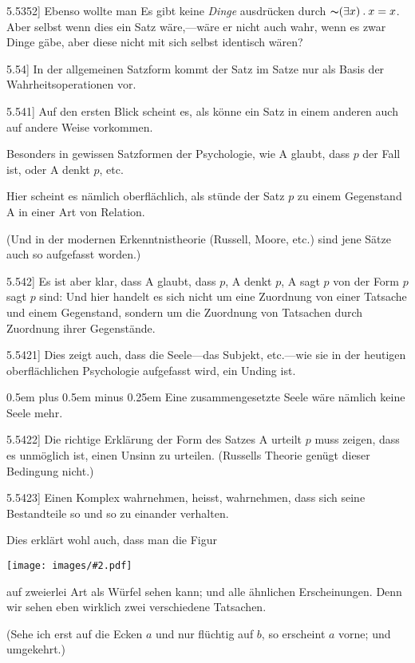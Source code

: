 \documentclass[12pt,oneside]{book}[2007/10/19]
\newcommand{\PropERef}[1]{\hyperref[PropE:#1]{#1}}
\newcommand{\PropositionG}[2]{%
  \item[\phantomsection\label{PropG:#1}\PropERef{#1}] #2%
}
\newcommand{\Illustration}[2][0.3\textwidth]{%
  \begin{center}
  \texttt{[image: images/\#2.pdf]}
  \end{center}
}
\newcommand{\Not}[1]{\mathord{\thicksim} #1}
\newcommand{\DotOp}{\mathbin{.}}
\newcommand{\Emph}[1]{\emph{#1}}%
\newcommand{\verystretchyspace}{\spaceskip0.5em plus 0.5em minus 0.25em}
\begin{document}
\begin{propositions}
\PropositionG{5.5352}
{Ebenso wollte man \glqq{}Es gibt keine \Emph{Dinge}\grqq{} ausdrücken
durch \glqq{}$\Not{(\exists x) \DotOp x = x}$\grqq{}. Aber selbst wenn
dies ein Satz wäre,---wäre er nicht auch wahr, wenn
es zwar \glqq{}Dinge gäbe\grqq{}, aber diese nicht mit sich
selbst identisch wären?}


\PropositionG{5.54}
{In der allgemeinen Satzform kommt der Satz im
Satze nur als Basis der Wahrheitsoperationen vor.}


\PropositionG{5.541}
{Auf den ersten Blick scheint es, als könne ein Satz
in einem anderen auch auf andere Weise vorkommen.

Besonders in gewissen Satzformen der Psychologie,
wie \glqq{}A glaubt, dass $p$ der Fall ist\grqq{}, oder
\glqq{}A denkt $p$\grqq{}, etc.

Hier scheint es nämlich oberflächlich, als stünde
der Satz $p$ zu einem Gegenstand A in einer Art
von Relation.

(Und in der modernen Erkenntnistheorie (Russell,
Moore, etc.) sind jene Sätze auch so aufgefasst
worden.)}


\PropositionG{5.542}
{Es ist aber klar, dass \glqq{}A glaubt, dass $p$\grqq{}, \glqq{}A
denkt $p$\grqq{}, \glqq{}A sagt $p$\grqq{} von der Form \glqq{}\glq{}$p$\grq{} sagt $p$\grqq{} sind:
Und hier handelt es sich nicht um eine Zuordnung
von einer Tatsache und einem Gegenstand, sondern
um die Zuordnung von Tatsachen durch Zuordnung
ihrer Gegenstände.}


\PropositionG{5.5421}
{Dies zeigt auch, dass die Seele---das Subjekt,
etc.---wie sie in der heutigen oberflächlichen Psychologie
aufgefasst wird, ein Unding ist.

{\verystretchyspace
Eine zusammengesetzte Seele wäre nämlich
keine Seele mehr.}}


\PropositionG{5.5422}
{Die richtige Erklärung der Form des Satzes \glqq{}A
urteilt $p$\grqq{} muss zeigen, dass es unmöglich ist, einen
Unsinn zu urteilen. (Russells Theorie genügt
dieser Bedingung nicht.)}


\PropositionG{5.5423}
{Einen Komplex wahrnehmen, heisst, wahrnehmen,
dass sich seine Bestandteile so und so zu einander
verhalten.

Dies erklärt wohl auch, dass man die Figur
\Illustration{cube}
auf zweierlei Art als Würfel sehen kann; und alle
ähnlichen Erscheinungen. Denn wir sehen eben
wirklich zwei verschiedene Tatsachen.

(Sehe ich erst auf die Ecken $a$ und nur flüchtig
auf $b$, so erscheint $a$ vorne; und umgekehrt.)}



\end{propositions}
\end{document}
